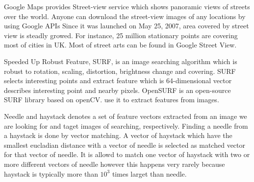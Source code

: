 

Google Maps provides Street-view service\cite{streetview} which shows panoramic views of streets over the world.
Anyone can download the street-view images of any locations by using Google APIs
Since it was launched on May 25, 2007, area covered by street view is steadly growed. For instance, 25 million stationary points are covering most of cities in UK.
Most of street arts can be found in Google Street View.

Speeded Up Robust Feature, SURF\cite{surf}, is an image searching algorithm which is robust to rotation, scaling, distortion, brightness change and covering.
SURF selects interesting points and extract feature which is 64-dimensional vector describes interesting point and nearby pixels.
OpenSURF\cite{opensurf} is an open-source SURF library based on openCV\cite{opencv}.
\name{} use it to extract features from images.

Needle and haystack denotes a set of feature vectors extracted from an image we are looking for and taget images of searching, respectively.
Finding a needle from a haystack is done by vector matching.
A vector of haystack which have the smallest eucladian distance with a vector of needle is selected as matched vector for that vector of needle.
It is allowd to match one vector of haystack with two or more different vectors of needle however this happens very rarely because haystack is typically more than $10^3$ times larget than needle.
